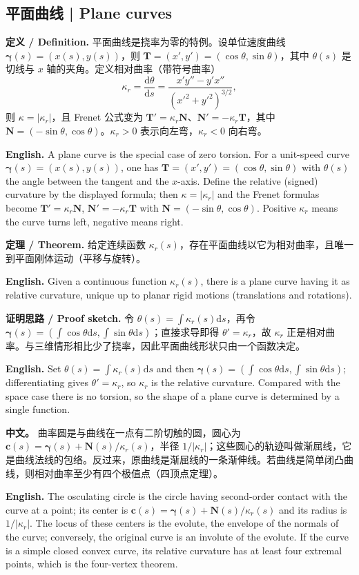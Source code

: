 \documentclass[UTF8,11pt,a4paper]{ctexart}
\newcommand{\APS}[2]{\par\noindent\textbf{中文。} #1\par\noindent\textbf{English.} #2\par\smallskip}
\newcommand{\EN}[1]{\par\noindent \textbf{English.} #1\par}
\newcommand{\DEF}[2]{\par\noindent\textbf{定义 / Definition.} #1\par\EN{#2}\par\smallskip}
\newcommand{\THM}[2]{\par\noindent\textbf{定理 / Theorem.} #1\par\EN{#2}\par\smallskip}
\newcommand{\PROOF}[2]{\par\noindent\textbf{证明思路 / Proof sketch.} #1\par\EN{#2}\par\smallskip}
\newcommand{\dd}{\mathrm{d}}
\newcommand{\bT}{\mathbf{T}}
\newcommand{\bN}{\mathbf{N}}
\newcommand{\bc}{\mathbf{c}}
\newcommand{\bgamma}{\boldsymbol{\gamma}}
\begin{document}
\subsection{平面曲线 | Plane curves}
\DEF{平面曲线是挠率为零的特例。设单位速度曲线 $\bgamma(s)=(x(s),y(s))$，则 $\bT=(x',y')=(\cos\theta,\sin\theta)$，其中 $\theta(s)$ 是切线与 $x$ 轴的夹角。定义相对曲率（带符号曲率）
\[
\kappa_r=\frac{\dd\theta}{\dd s}=\frac{x'y''-y'x''}{(x'^2+y'^2)^{3/2}} ,
\]
则 $\kappa=|\kappa_r|$，且 Frenet 公式变为 $\bT'=\kappa_r\bN$、$\bN'=-\kappa_r\bT$，其中 $\bN=(-\sin\theta,\cos\theta)$。$\kappa_r>0$ 表示向左弯，$\kappa_r<0$ 向右弯。}{A plane curve is the special case of zero torsion. For a unit-speed curve $\bgamma(s)=(x(s),y(s))$, one has $\bT=(x',y')=(\cos\theta,\sin\theta)$ with $\theta(s)$ the angle between the tangent and the $x$-axis. Define the relative (signed) curvature by the displayed formula; then $\kappa=|\kappa_r|$ and the Frenet formulas become $\bT'=\kappa_r\bN$, $\bN'=-\kappa_r\bT$ with $\bN=(-\sin\theta,\cos\theta)$. Positive $\kappa_r$ means the curve turns left, negative means right.}
\THM{给定连续函数 $\kappa_r(s)$，存在平面曲线以它为相对曲率，且唯一到平面刚体运动（平移与旋转）。}{Given a continuous function $\kappa_r(s)$, there is a plane curve having it as relative curvature, unique up to planar rigid motions (translations and rotations).}
\PROOF{令 $\theta(s)=\int\kappa_r(s)\dd s$，再令 $\bgamma(s)=(\int\cos\theta\dd s,\int\sin\theta\dd s)$；直接求导即得 $\theta'=\kappa_r$，故 $\kappa_r$ 正是相对曲率。与三维情形相比少了挠率，因此平面曲线形状只由一个函数决定。}{Set $\theta(s)=\int\kappa_r(s)\dd s$ and then $\bgamma(s)=(\int\cos\theta\dd s,\int\sin\theta\dd s)$; differentiating gives $\theta'=\kappa_r$, so $\kappa_r$ is the relative curvature. Compared with the space case there is no torsion, so the shape of a plane curve is determined by a single function.}
\APS{曲率圆是与曲线在一点有二阶切触的圆，圆心为 $\bc(s)=\bgamma(s)+\bN(s)/\kappa_r(s)$，半径 $1/|\kappa_r|$；这些圆心的轨迹叫做渐屈线，它是曲线法线的包络。反过来，原曲线是渐屈线的一条渐伸线。若曲线是简单闭凸曲线，则相对曲率至少有四个极值点（四顶点定理）。}{The osculating circle is the circle having second-order contact with the curve at a point; its center is $\bc(s)=\bgamma(s)+\bN(s)/\kappa_r(s)$ and its radius is $1/|\kappa_r|$. The locus of these centers is the evolute, the envelope of the normals of the curve; conversely, the original curve is an involute of the evolute. If the curve is a simple closed convex curve, its relative curvature has at least four extremal points, which is the four-vertex theorem.}
\end{document}
